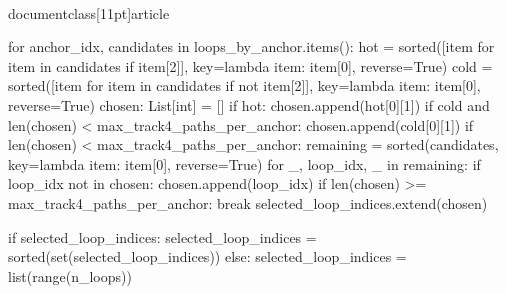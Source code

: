 \\documentclass[11pt]{article}
\begin{document}
\begin{CodeBlock}
{{{{{{                for anchor_idx, candidates in loops_by_anchor.items():
                    hot = sorted([item for item in candidates if item[2]], key=lambda item: item[0], reverse=True)
                    cold = sorted([item for item in candidates if not item[2]], key=lambda item: item[0], reverse=True)
                    chosen: List[int] = []
                    if hot:
                        chosen.append(hot[0][1])
                    if cold and len(chosen) < max_track4_paths_per_anchor:
                        chosen.append(cold[0][1])
                    if len(chosen) < max_track4_paths_per_anchor:
                        remaining = sorted(candidates, key=lambda item: item[0], reverse=True)
                        for _, loop_idx, _ in remaining:
                            if loop_idx not in chosen:
                                chosen.append(loop_idx)
                            if len(chosen) >= max_track4_paths_per_anchor:
                                break
                    selected_loop_indices.extend(chosen)

                if selected_loop_indices:
                    selected_loop_indices = sorted(set(selected_loop_indices))
                else:
                    selected_loop_indices = list(range(n_loops))

}}}}}}
\end{CodeBlock}
\end{document}
